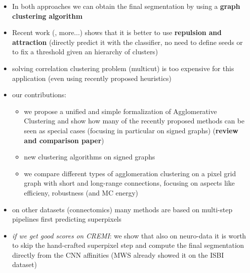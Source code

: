 \begin{itemize}
\item In both approaches we can obtain the final segmentation by using a \textbf{graph clustering algorithm}
\item Recent work (\cite{wolf2018mutex}, more...) shows that it is better to use \textbf{repulsion and attraction} (directly predict it with the classifier, no need to define seeds or to fix a threshold given an hierarchy of clusters)
\item solving correlation clustering problem (multicut) is too expensive for this application (even using recently proposed heuristics)
\item our contributions:
\begin{itemize}
\item we propose a unified and simple formalization of Agglomerative Clustering and show how many of the recently proposed methods can be seen as special cases (focusing in particular on signed graphs) (\textbf{review and comparison paper})
\item new clustering algorithms on signed graphs
\item we compare different types of agglomeration clustering on a pixel grid graph with short and long-range connections, focusing on aspects like efficieny, robustness (and MC energy) 

\end{itemize}
\item on other datasets (connectomics) many methods are based on multi-step pipelines first predicting superpixels
\item \textit{if we get good scores on CREMI}: we show that also on neuro-data it is worth to skip the hand-crafted superpixel step and compute the final segmentation directly from the CNN affinities (MWS already showed it on the ISBI dataset)

\end{itemize}
